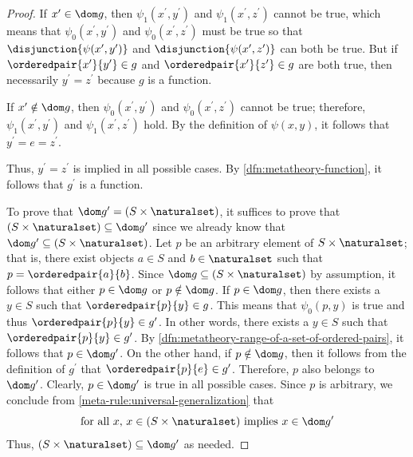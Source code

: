 \begin{proof}
    \vspace{0.3cm}
    \noindent
    If \( x^{\prime} \in \dom g \), then \( \psi_{1}(x^{\prime}, y^{\prime}) \) and \( \psi_{1}(x^{\prime}, z^{\prime}) \) cannot be true, which means
    that \( \psi_{0}(x^{\prime}, y^{\prime}) \) and \( \psi_{0}(x^{\prime}, z^{\prime}) \) must be true so that
    \( \disjunction{\psi(x^{\prime}, y^{\prime})} \) and \( \disjunction{\psi(x^{\prime}, z^{\prime})} \) can both be true.
    But if \( \orderedpair{x^{\prime}}{y^{\prime}} \in g \) and \( \orderedpair{x^{\prime}}{z^{\prime}} \in g \) are both true, then necessarily
    \( y^{\prime} = z^{\prime} \) because \( g \) is a function.

    \vspace{0.3cm}
    \noindent
    If \( x^{\prime} \notin \dom g \), then \( \psi_{0}(x^{\prime}, y^{\prime}) \) and \( \psi_{0}(x^{\prime}, z^{\prime}) \) cannot be true;
    therefore, \( \psi_{1}(x^{\prime}, y^{\prime}) \) and \( \psi_{1}(x^{\prime}, z^{\prime}) \) hold.
    By the definition of \( \psi(x, y) \), it follows that \( y^{\prime} = e = z^{\prime} \).

    \vspace{0.3cm}
    \noindent
    Thus, \( y^{\prime} = z^{\prime} \) is implied in all possible cases.
    By \cref{dfn:metatheory-function}, it follows that \( g^{\prime} \) is a function.

    \vspace{0.3cm}
    \noindent
    To prove that \( \dom g^{\prime} = \mleft( S \times \naturalset \mright) \), it suffices to prove that \( \mleft( S \times \naturalset \mright) \subseteq \dom g^{\prime} \)
    since we already know that \( \dom g^{\prime} \subseteq \mleft( S \times \naturalset \mright) \).
    Let \( p \) be an arbitrary element of \( S \times \naturalset \);
    that is, there exist objects \( a \in S \) and \( b \in \naturalset \) such that \( p = \orderedpair{a}{b} \).
    Since \( \dom g \subseteq \mleft( S \times \naturalset \mright) \) by assumption, it follows that either \( p \in \dom g \) or \( p \notin \dom g \).
    If \( p \in \dom g \), then there exists a \( y \in S \) such that \( \orderedpair{p}{y} \in g \).
    This means that \( \psi_{0}(p, y) \) is true and thus \( \orderedpair{p}{y} \in g^{\prime} \).
    In other words, there exists a \( y \in S \) such that \( \orderedpair{p}{y} \in g^{\prime} \).
    By \cref{dfn:metatheory-range-of-a-set-of-ordered-pairs}, it follows that \( p \in \dom g^{\prime} \).
    On the other hand, if \( p \notin \dom g \), then it follows from the definition of \( g^{\prime} \) that \( \orderedpair{p}{e} \in g^{\prime} \).
    Therefore, \( p \) also belongs to \( \dom g^{\prime} \).
    Clearly, \( p \in \dom g^{\prime} \) is true in all possible cases.
    Since \( p \) is arbitrary, we conclude from \cref{meta-rule:universal-generalization} that
    \begin{equation*}
        \text{for all \( x  \), \( x \in \mleft( S \times \naturalset \mright) \) implies \( x \in \dom g^{\prime} \)}
    \end{equation*}
    Thus, \( \mleft( S \times \naturalset \mright) \subseteq \dom g^{\prime} \) as needed.


\end{proof}
